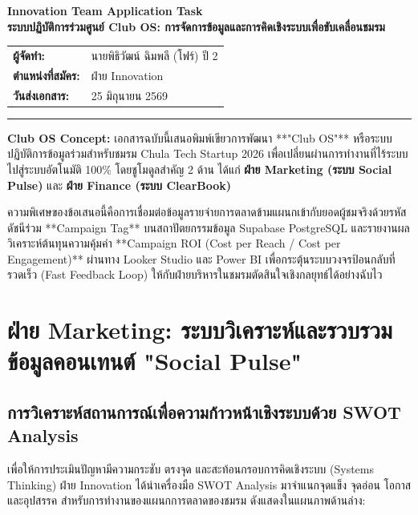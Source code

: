 \documentclass[10pt,a4paper]{article}
\begin{document}
\begin{center}
  \vspace*{0.3cm}
  {\Huge\bfseries\chulafont\color{chulapink} Innovation Team Application Task}\\[0.1cm]
  {\Large\bfseries\chulafont\color{darkblue} ระบบปฏิบัติการร่วมศูนย์ Club OS: การจัดการข้อมูลและการคิดเชิงระบบเพื่อขับเคลื่อนชมรม}\\[0.3cm]
  \begin{tabular}{ll}
    \textbf{ผู้จัดทำ:} & นายพิธิวัฒน์ ฉิมพลี (โฟร์) ปี 2 \\
    \textbf{ตำแหน่งที่สมัคร:} & ฝ่าย Innovation \\
    \textbf{วันส่งเอกสาร:} & 25 มิถุนายน 2569 \\
  \end{tabular}
  \vskip 0.3cm
  \hrule
\end{center}

\begin{highlightbox}
  \noindent \textbf{Club OS Concept:} 
  เอกสารฉบับนี้เสนอพิมพ์เขียวการพัฒนา **"Club OS"** หรือระบบปฏิบัติการข้อมูลร่วมสำหรับชมรม Chula Tech Startup 2026 เพื่อเปลี่ยนผ่านการทำงานที่ไร้ระบบไปสู่ระบบอัตโนมัติ 100\% โดยชูโมดูลสำคัญ 2 ด้าน ได้แก่ \textbf{ฝ่าย Marketing (ระบบ Social Pulse)} และ \textbf{ฝ่าย Finance (ระบบ ClearBook)} 
  
  ความพิเศษของข้อเสนอนี้คือการเชื่อมต่อข้อมูลรายจ่ายการตลาดข้ามแผนกเข้ากับยอดผู้ชมจริงด้วยรหัสดัชนีร่วม **Campaign Tag** บนสถาปัตยกรรมข้อมูล Supabase PostgreSQL และรายงานผลวิเคราะห์ต้นทุนความคุ้มค่า **Campaign ROI (Cost per Reach / Cost per Engagement)** ผ่านทาง Looker Studio และ Power BI เพื่อกระตุ้นระบบวงจรป้อนกลับที่รวดเร็ว (Fast Feedback Loop) ให้กับฝ่ายบริหารในชมรมตัดสินใจเชิงกลยุทธ์ได้อย่างฉับไว
\end{highlightbox}

\section{ฝ่าย Marketing: ระบบวิเคราะห์และรวบรวมข้อมูลคอนเทนต์ "Social Pulse"}
\subsection{การวิเคราะห์สถานการณ์เพื่อความก้าวหน้าเชิงระบบด้วย SWOT Analysis}
เพื่อให้การประเมินปัญหามีความกระชับ ตรงจุด และสะท้อนกรอบการคิดเชิงระบบ (Systems Thinking) ฝ่าย Innovation ได้นำเครื่องมือ SWOT Analysis มาจำแนกจุดแข็ง จุดอ่อน โอกาส และอุปสรรค สำหรับการทำงานของแผนกการตลาดของชมรม ดังแสดงในแผนภาพด้านล่าง:
\end{document}
